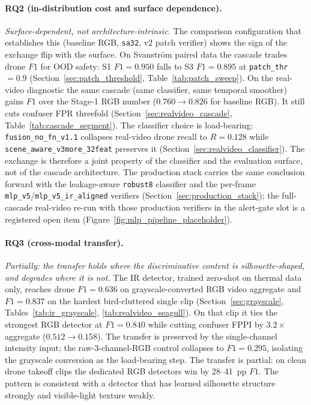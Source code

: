 \paragraph{RQ2 (in-distribution cost and surface dependence).}
\emph{Surface-dependent, not architecture-intrinsic.} The comparison configuration that establishes this (baseline RGB, \texttt{sa32}, v2 patch verifier) shows the sign of the exchange flip with the surface. On Svanstr\"om paired data the cascade trades drone $F1$ for OOD safety: S1 $F1=0.950$ falls to S3 $F1=0.895$ at \texttt{patch\_thr}$=0.9$ (Section~\ref{sec:patch_threshold}, Table~\ref{tab:patch_sweep}). On the real-video diagnostic the same cascade (same classifier, same temporal smoother) gains $F1$ over the Stage-1 RGB number ($0.760 \to 0.826$ for baseline RGB). It still cuts confuser FPR threefold (Section~\ref{sec:realvideo_cascade}, Table~\ref{tab:cascade_segment}). The classifier choice is load-bearing: \texttt{fusion\_no\_fn\_v1.1} collapses real-video drone recall to $R=0.128$ while \texttt{scene\_aware\_v3more\_32feat} preserves it (Section~\ref{sec:realvideo_classifier}). The exchange is therefore a joint property of the classifier and the evaluation surface, not of the cascade architecture. The production stack carries the same conclusion forward with the leakage-aware \texttt{robust8} classifier and the per-frame \texttt{mlp\_v5}/\texttt{mlp\_v5\_ir\_aligned} verifiers (Section~\ref{sec:production_stack}); the full-cascade real-video re-run with those production verifiers in the alert-gate slot is a registered open item (Figure~\ref{fig:mlp_pipeline_placeholder}).

\paragraph{RQ3 (cross-modal transfer).}
\emph{Partially: the transfer holds where the discriminative content is silhouette-shaped, and degrades where it is not.} The IR detector, trained zero-shot on thermal data only, reaches drone $F1=0.636$ on grayscale-converted RGB video aggregate and $F1=0.837$ on the hardest bird-cluttered single clip (Section~\ref{sec:grayscale}, Tables~\ref{tab:ir_grayscale}, \ref{tab:realvideo_seagull}). On that clip it ties the strongest RGB detector at $F1=0.840$ while cutting confuser FPPI by $3.2\times$ aggregate ($0.512 \to 0.158$). The transfer is preserved by the single-channel intensity input; the raw-3-channel-RGB control collapses to $F1=0.295$, isolating the grayscale conversion as the load-bearing step. The transfer is partial: on clean drone takeoff clips the dedicated RGB detectors win by 28--41~pp $F1$. The pattern is consistent with a detector that has learned silhouette structure strongly and visible-light texture weakly.

